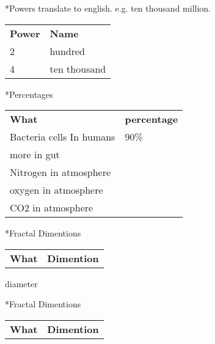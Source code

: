 \documentclass[8pt,a4paper]{extarticle}
\begin{document}
\pagebreak
\begin{section}
*{Powers}
translate to english. e.g. ten thousand million.\\
\begin{tabular}{l l}
\bf{Power} & \bf{Name}\\
2 & hundred \\
4 & ten thousand

\end{tabular}
\end{section}

\pagebreak
\begin{section}
*{Percentages}

\begin{tabular}{l l}
\bf{What} & \bf{percentage}\\
Bacteria cells In humans & 90\% \\
more in gut\\
Nitrogen in atmosphere\\
oxygen in atmosphere\\
CO2 in atmosphere\\

\end{tabular}
\end{section}













\pagebreak
\begin{section}
*{Fractal Dimentions}

\begin{tabular}{l l}
\bf{What} & \bf{Dimention}\\

\end{tabular}
\end{section}


diameter
\pagebreak
\begin{section}
*{Fractal Dimentions}

\begin{tabular}{l l}
\bf{What} & \bf{Dimention}\\

\end{tabular}
\end{section}
\end{document}
